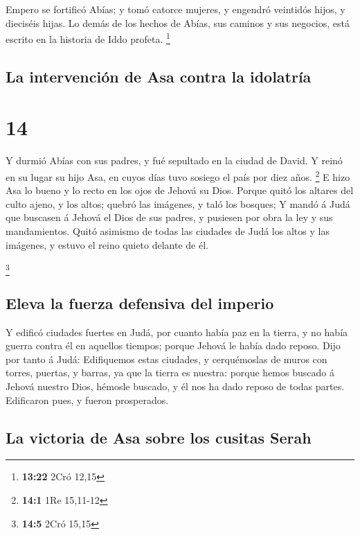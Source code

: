  Empero se fortificó Abías; y tomó catorce mujeres, y
engendró veintidós hijos, y dieciséis hijas.  Lo demás de
los hechos de Abías, sus caminos y sus negocios, está escrito en la
historia de Iddo profeta. \footnote{\textbf{13:22} 2Cró 12,15}

\hypertarget{la-intervenciuxf3n-de-asa-contra-la-idolatruxeda}{%
\subsection{La intervención de Asa contra la
idolatría}\label{la-intervenciuxf3n-de-asa-contra-la-idolatruxeda}}

\hypertarget{section-13}{%
\section{14}\label{section-13}}

 Y durmió Abías con sus padres, y fué sepultado en la
ciudad de David. Y reinó en su lugar su hijo Asa, en cuyos días tuvo
sosiego el país por diez años. \footnote{\textbf{14:1} 1Re 15,11-12}
 E hizo Asa lo bueno y lo recto en los ojos de Jehová su
Dios.  Porque quitó los altares del culto ajeno, y los
altos; quebró las imágenes, y taló los bosques;  Y mandó á
Judá que buscasen á Jehová el Dios de sus padres, y pusiesen por obra la
ley y sus mandamientos.  Quitó asimismo de todas las
ciudades de Judá los altos y las imágenes, y estuvo el reino quieto
delante de él.

\footnote{\textbf{14:5} 2Cró 15,15}

\hypertarget{eleva-la-fuerza-defensiva-del-imperio}{%
\subsection{Eleva la fuerza defensiva del
imperio}\label{eleva-la-fuerza-defensiva-del-imperio}}

 Y edificó ciudades fuertes en Judá, por cuanto había paz
en la tierra, y no había guerra contra él en aquellos tiempos; porque
Jehová le había dado reposo.  Dijo por tanto á Judá:
Edifiquemos estas ciudades, y cerquémoslas de muros con torres, puertas,
y barras, ya que la tierra es nuestra: porque hemos buscado á Jehová
nuestro Dios, hémosle buscado, y él nos ha dado reposo de todas partes.
Edificaron pues, y fueron prosperados.

\hypertarget{la-victoria-de-asa-sobre-los-cusitas-serah}{%
\subsection{La victoria de Asa sobre los cusitas
Serah}\label{la-victoria-de-asa-sobre-los-cusitas-serah}}

